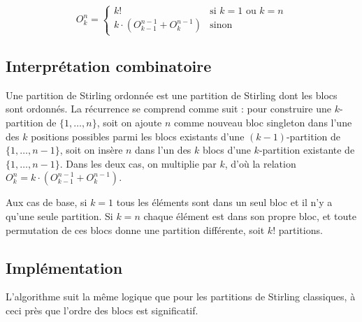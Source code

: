 \documentclass[12pt, a4paper]{report}
\begin{document}
\[
  O^n_k =
  \begin{cases}
    k! & \text{si } k = 1 \text{ ou } k = n \\[6pt]
    k \cdot (O^{n-1}_{k-1} + O^{n-1}_k) & \text{sinon}
  \end{cases}
\]

\subsection{Interpr\'etation combinatoire}

Une partition de Stirling ordonn\'ee est une partition de Stirling dont les blocs
sont ordonn\'es. La r\'ecurrence se comprend comme suit : pour construire une
$k$-partition de $\{1, \ldots, n\}$, soit on ajoute $n$ comme nouveau bloc singleton
dans l'une des $k$ positions possibles parmi les blocs existants d'une
$(k-1)$-partition de $\{1, \ldots, n-1\}$, soit on ins\`ere $n$ dans l'un des $k$
blocs d'une $k$-partition existante de $\{1, \ldots, n-1\}$. Dans les deux cas, on
multiplie par $k$, d'o\`u la relation $O^n_k = k \cdot (O^{n-1}_{k-1} + O^{n-1}_k)$.

Aux cas de base, si $k = 1$ tous les \'el\'ements sont dans un seul bloc et il n'y
a qu'une seule partition. Si $k = n$ chaque \'el\'ement est dans son propre bloc, et
toute permutation de ces blocs donne une partition diff\'erente, soit $k!$ partitions.

\subsection{Impl\'ementation}

L'algorithme suit la m\^eme logique que pour les partitions de Stirling
classiques, \`a ceci pr\`es que l'ordre des blocs est significatif.
\end{document}
